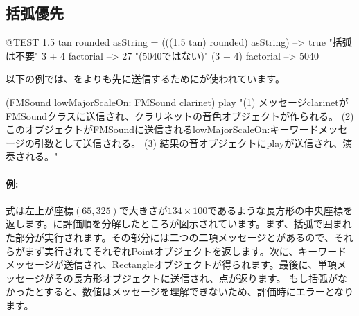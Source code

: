 \documentclass[a4paper,10pt,twoside]{book}
\begin{document}
\subsection{括弧優先}


\begin{code}{@TEST}
1.5 tan rounded asString = (((1.5 tan) rounded) asString) --> true    "括弧は不要"
3 + 4 factorial   --> 27    "(5040ではない)"
(3 + 4) factorial --> 5040
\end{code}

以下の例では、をよりも先に送信するためにが使われています。
\begin{code}{}
(FMSound lowMajorScaleOn: FMSound clarinet) play 
"(1) メッセージclarinetがFMSoundクラスに送信され、クラリネットの音色オブジェクトが作られる。
 (2) このオブジェクトがFMSoundに送信されるlowMajorScaleOn:キーワードメッセージの引数として送信される。
 (3) 結果の音オブジェクトにplayが送信され、演奏される。"
\end{code}



\paragraph{例:}
式は左上が座標$(65, 325)$で大きさが$134{\times}100$であるような長方形の中央座標を返します。に評価順を分解したところが図示されています。まず、括弧で囲まれた部分が実行されます。その部分には二つの二項メッセージとがあるので、それらがまず実行されてそれぞれPointオブジェクトを返します。次に、キーワードメッセージが送信され、Rectangleオブジェクトが得られます。最後に、単項メッセージがその長方形オブジェクトに送信され、点が返ります。
もし括弧がなかったとすると、数値はメッセージを理解できないため、評価時にエラーとなります。
\end{document}
